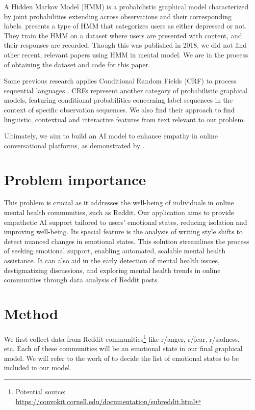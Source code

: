 \documentclass[conference,compsoc]{IEEEtran}
\begin{document}
A Hidden Markov Model (HMM) is a probabilistic graphical model characterized by joint probabilities extending across observations and their corresponding labels. \citet{Ansari+18:dcr-hmm} presents a type of HMM that categorizes users as either depressed or not. They train the HMM on a dataset where users are presented with content, and their responses are recorded. Though this was published in 2018, we did not find other recent, relevant papers using HMM in mental model. We are in the process of obtaining the dataset and code for this paper. 

Some previous research applies Conditional Random Fields (CRF) to process sequential languages \citep{Guo+20:opinion-holders, Zhang+Singh-19:attributed-oriented}. CRFs represent another category of probabilistic graphical models, featuring conditional probabilities concerning label sequences in the context of specific observation sequences. We also find their approach to find linguistic, contextual and interactive features from text relevant to our problem. 

Ultimately, we aim to build an AI model to enhance empathy in online conversational platforms, as demonstrated by \citet{Sharma+23:human-ai-empathic-conversation}.

\section{Problem importance}
This problem is crucial as it addresses the well-being of individuals in online mental health communities, such as Reddit. Our application aims to provide empathetic AI support tailored to users' emotional states, reducing isolation and improving well-being. Its special feature is the analysis of writing style shifts to detect nuanced changes in emotional states. This solution streamlines the process of seeking emotional support, enabling automated, scalable mental health assistance. It can also aid in the early detection of mental health issues, destigmatizing discussions, and exploring mental health trends in online communities through data analysis of Reddit posts.

\section{Method}
We first collect data from Reddit communities\footnote{Potential source: \newline \url{https://convokit.cornell.edu/documentation/subreddit.html}} like r/anger, r/fear, r/sadness, etc. Each of these communities will be an emotional state in our final graphical model. We will refer to the work of \citet{Plutchik+Kellerman-13:emotion} to decide the list of emotional states to be included in our model. 
\end{document}
